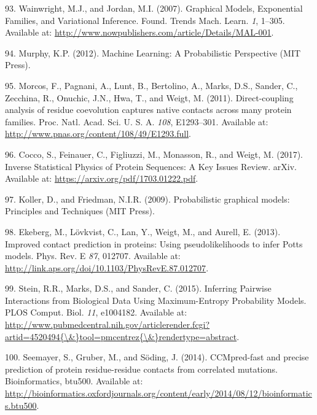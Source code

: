 \documentclass[11pt,a4paper,twoside]{book}
\theoremstyle{definition}
\theoremstyle{definition}
\theoremstyle{remark}
\begin{document}
\hypertarget{ref-Wainwright2007}{}
93. Wainwright, M.J., and Jordan, M.I. (2007). Graphical Models,
Exponential Families, and Variational Inference. Found. Trends Mach.
Learn. \emph{1}, 1--305. Available at:
\url{http://www.nowpublishers.com/article/Details/MAL-001}.

\hypertarget{ref-Murphy2012}{}
94. Murphy, K.P. (2012). Machine Learning: A Probabilistic Perspective
(MIT Press).

\hypertarget{ref-Morcos2011}{}
95. Morcos, F., Pagnani, A., Lunt, B., Bertolino, A., Marks, D.S.,
Sander, C., Zecchina, R., Onuchic, J.N., Hwa, T., and Weigt, M. (2011).
Direct-coupling analysis of residue coevolution captures native contacts
across many protein families. Proc. Natl. Acad. Sci. U. S. A.
\emph{108}, E1293--301. Available at:
\url{http://www.pnas.org/content/108/49/E1293.full}.

\hypertarget{ref-Cocco2017}{}
96. Cocco, S., Feinauer, C., Figliuzzi, M., Monasson, R., and Weigt, M.
(2017). Inverse Statistical Physics of Protein Sequences: A Key Issues
Review. arXiv. Available at: \url{https://arxiv.org/pdf/1703.01222.pdf}.

\hypertarget{ref-Koller2009}{}
97. Koller, D., and Friedman, N.I.R. (2009). Probabilistic graphical
models: Principles and Techniques (MIT Press).

\hypertarget{ref-Ekeberg2013}{}
98. Ekeberg, M., Lövkvist, C., Lan, Y., Weigt, M., and Aurell, E.
(2013). Improved contact prediction in proteins: Using pseudolikelihoods
to infer Potts models. Phys. Rev. E \emph{87}, 012707. Available at:
\url{http://link.aps.org/doi/10.1103/PhysRevE.87.012707}.

\hypertarget{ref-Stein2015a}{}
99. Stein, R.R., Marks, D.S., and Sander, C. (2015). Inferring Pairwise
Interactions from Biological Data Using Maximum-Entropy Probability
Models. PLOS Comput. Biol. \emph{11}, e1004182. Available at:
\href{http://www.pubmedcentral.nih.gov/articlerender.fcgi?artid=4520494\%7B/\&\%7Dtool=pmcentrez\%7B/\&\%7Drendertype=abstract}{http://www.pubmedcentral.nih.gov/articlerender.fcgi?artid=4520494\{\textbackslash{}\&\}tool=pmcentrez\{\textbackslash{}\&\}rendertype=abstract}.

\hypertarget{ref-Seemayer2014}{}
100. Seemayer, S., Gruber, M., and Söding, J. (2014). CCMpred-fast and
precise prediction of protein residue-residue contacts from correlated
mutations. Bioinformatics, btu500. Available at:
\url{http://bioinformatics.oxfordjournals.org/content/early/2014/08/12/bioinformatics.btu500}.
\end{document}
